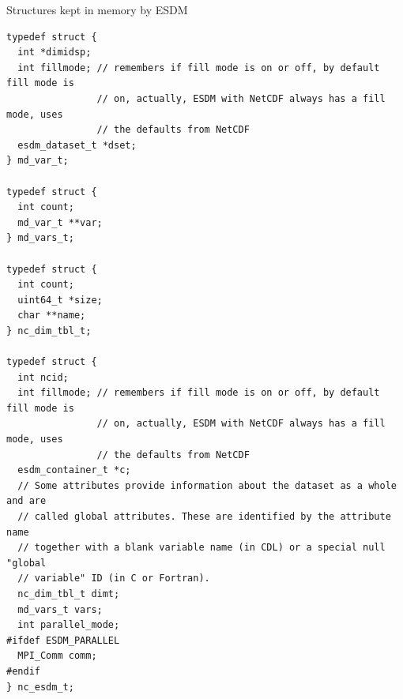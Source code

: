 \begin{tcbcode}[label=esdm-mem]{Structures kept in memory by ESDM}
\begin{lstlisting}[upquote=true]
typedef struct {
  int *dimidsp;
  int fillmode; // remembers if fill mode is on or off, by default fill mode is
                // on, actually, ESDM with NetCDF always has a fill mode, uses
                // the defaults from NetCDF
  esdm_dataset_t *dset;
} md_var_t;

typedef struct {
  int count;
  md_var_t **var;
} md_vars_t;

typedef struct {
  int count;
  uint64_t *size;
  char **name;
} nc_dim_tbl_t;

typedef struct {
  int ncid;
  int fillmode; // remembers if fill mode is on or off, by default fill mode is
                // on, actually, ESDM with NetCDF always has a fill mode, uses
                // the defaults from NetCDF
  esdm_container_t *c;
  // Some attributes provide information about the dataset as a whole and are
  // called global attributes. These are identified by the attribute name
  // together with a blank variable name (in CDL) or a special null "global
  // variable" ID (in C or Fortran).
  nc_dim_tbl_t dimt;
  md_vars_t vars;
  int parallel_mode;
#ifdef ESDM_PARALLEL
  MPI_Comm comm;
#endif
} nc_esdm_t;
\end{lstlisting}
\end{tcbcode}

